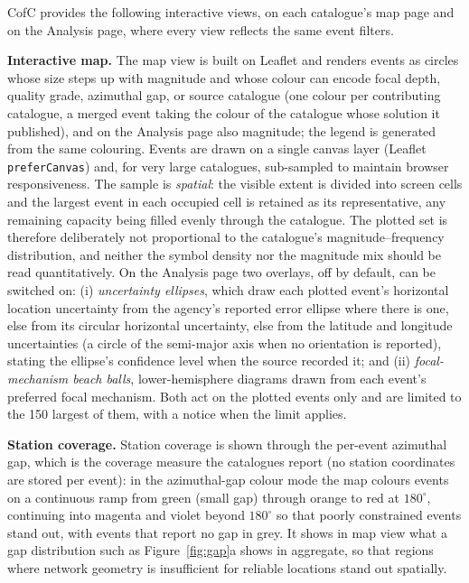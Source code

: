 \documentclass[12pt]{article}
\begin{document}
CofC provides the following interactive views, on each catalogue's map page and
on the Analysis page, where every view reflects the same event filters.

\textbf{Interactive map.}  The map view is built on Leaflet
\citep{leaflet2024} and renders events as circles whose size steps up with
magnitude and whose colour can encode focal depth, quality grade, azimuthal gap,
or source catalogue (one colour per contributing catalogue, a merged event taking
the colour of the catalogue whose solution it published), and on the Analysis
page also magnitude; the legend is generated from the same colouring.  Events are drawn on a
single canvas layer (Leaflet \texttt{preferCanvas}) and, for very large
catalogues, sub-sampled to maintain browser responsiveness.  The sample is
\emph{spatial}: the visible extent is divided into screen cells and the largest
event in each occupied cell is retained as its representative, any remaining
capacity being filled evenly through the catalogue.  The plotted set
is therefore deliberately not proportional to the catalogue's
magnitude--frequency distribution, and neither the symbol density nor the
magnitude mix should be read quantitatively.  On the Analysis page two overlays,
off by default, can be switched on: (i) \emph{uncertainty ellipses}, which draw
each plotted event's horizontal location uncertainty from the agency's reported
error ellipse where there is one, else from its circular horizontal uncertainty,
else from the latitude and longitude uncertainties (a circle of the semi-major
axis when no orientation is reported), stating the ellipse's confidence level
when the source recorded it; and (ii) \emph{focal-mechanism beach balls},
lower-hemisphere diagrams drawn from each event's preferred focal mechanism.
Both act on the plotted events only and are limited to the 150 largest of them,
with a notice when the limit applies.

\textbf{Station coverage.}  Station coverage is shown through the per-event
azimuthal gap, which is the coverage measure the catalogues report (no station
coordinates are stored per event): in the azimuthal-gap colour mode the map
colours events on a continuous ramp from green (small gap) through orange to red
at $180^{\circ}$, continuing into magenta and violet beyond $180^{\circ}$ so that
poorly constrained events stand out, with events that report no gap in grey.  It
shows in map view what a gap distribution such as Figure~\ref{fig:gap}a shows in
aggregate, so that regions where network geometry is insufficient for reliable
locations stand out spatially.
\end{document}
